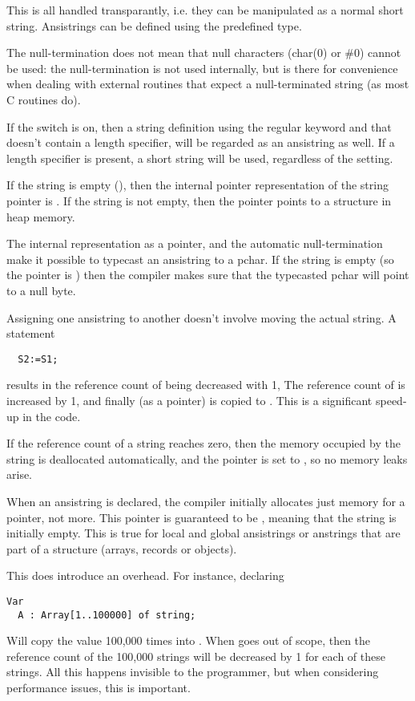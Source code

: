 This is all handled transparantly, i.e. they can be manipulated as a normal 
short string. Ansistrings can be defined using the predefined  
type. 

\begin{remark} 
The null-termination does not mean that null characters (char(0) or \#0) 
cannot be used: the null-termination is not used internally, but is there for
convenience when dealing with external routines that expect a
null-terminated string (as most C routines do).
\end{remark}

If the  switch is on, then a string definition using the
regular  keyword and that doesn't contain a length specifier, 
will be regarded as an ansistring as well. If a length specifier is present,
a short string will be used, regardless of the  setting.

If the string is empty (), then the internal pointer representation
of the string pointer is . If the string is not empty, then the 
pointer points to a structure in heap memory.

The internal representation as a pointer, and the automatic null-termination
make it possible to typecast an ansistring to a pchar. If the string is empty 
(so the pointer is ) then the compiler makes sure that the typecasted 
pchar will point to a null byte.

Assigning one ansistring to another doesn't involve moving the actual
string. A statement
\begin{verbatim}
  S2:=S1;
\end{verbatim}
results in the reference count of  being decreased with 1,
The reference count of  is increased by 1, and finally 
(as a pointer) is copied to . This is a significant speed-up in
the code.

If the reference count of a string reaches zero, then the memory occupied 
by the string is deallocated automatically, and the pointer is set to
, so no memory leaks arise.

When an ansistring is declared, the \fpc compiler initially
allocates just memory for a pointer, not more. This pointer is guaranteed
to be , meaning that the string is initially empty. This is
true for local and global ansistrings or anstrings that are part of a 
structure (arrays, records or objects).

This does introduce an overhead. For instance, declaring
\begin{verbatim}
Var
  A : Array[1..100000] of string;
\end{verbatim}
Will copy the value  100,000 times into . 
When  goes out of scope, then the reference 
count of the 100,000 strings will be decreased by 1 for each
of these strings. All this happens invisible to the programmer, 
but when considering performance issues, this is important.


